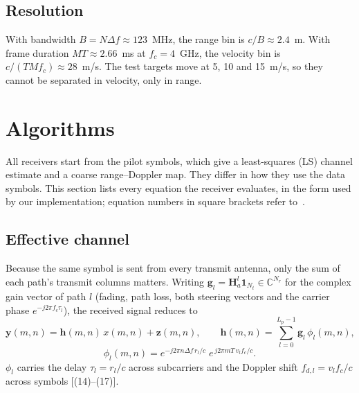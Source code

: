\documentclass[11pt,a4paper]{article}
\newcommand{\BH}{\mathbf{H}}
\begin{document}
\subsection{Resolution}
With bandwidth $B=N\Delta f\approx 123$~MHz, the range bin is $c/B\approx 2.4$~m. With frame duration $MT\approx 2.66$~ms at $f_c=4$~GHz, the velocity bin is $c/(TMf_c)\approx 28$~m/s. The test targets move at 5, 10 and 15~m/s, so they cannot be separated in velocity, only in range.

\section{Algorithms}\label{sec:algos}
All receivers start from the pilot symbols, which give a least-squares (LS) channel estimate and a coarse range--Doppler map. They differ in how they use the data symbols. This section lists every equation the receiver evaluates, in the form used by our implementation; equation numbers in square brackets refer to~\cite{isacnet}.

\subsection{Effective channel}
Because the same symbol is sent from every transmit antenna, only the sum of each path's transmit columns matters. Writing $\mathbf{g}_l=\BH_a^l\mathbf{1}_{N_t}\in\mathbb{C}^{N_r}$ for the complex gain vector of path $l$ (fading, path loss, both steering vectors and the carrier phase $e^{-j2\pi f_c\tau_l}$), the received signal reduces to
\begin{equation}
  \mathbf{y}(m,n)=\mathbf{h}(m,n)\,x(m,n)+\mathbf{z}(m,n),\qquad
  \mathbf{h}(m,n)=\sum_{l=0}^{L_p-1}\mathbf{g}_l\,\phi_l(m,n),
\label{eq:effch}
\end{equation}
\begin{equation}
  \phi_l(m,n)=e^{-j2\pi n\Delta f\,r_l/c}\;e^{\,j2\pi mT\,v_l f_c/c}.
\label{eq:phi}
\end{equation}
$\phi_l$ carries the delay $\tau_l=r_l/c$ across subcarriers and the Doppler shift $f_{d,l}=v_lf_c/c$ across symbols [(14)--(17)].
\end{document}
